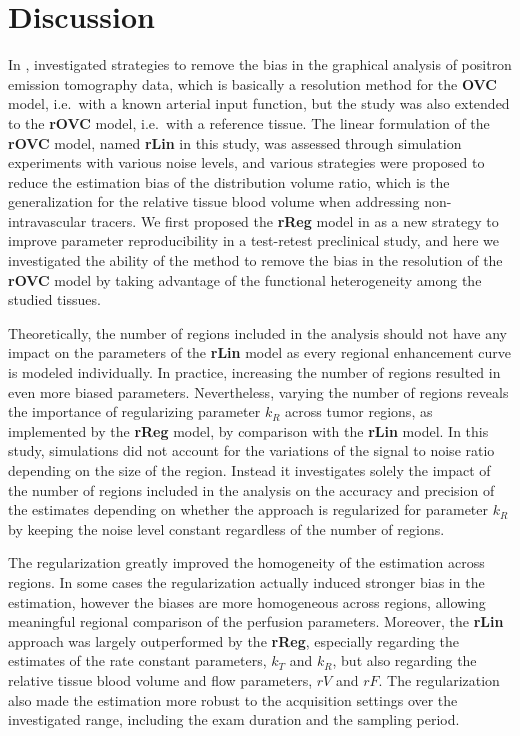 \section{Discussion}
In \citeyear{Logan:2001ip}, \citet{Logan:2001ip} investigated strategies to remove the bias in the graphical analysis of positron emission tomography data, which is basically a resolution method for the \textbf{OVC} model, i.e.~with a known arterial input function, but the study was also extended to the \textbf{rOVC} model, i.e.~with a reference tissue.
The linear formulation of the \textbf{rOVC} model, named \textbf{rLin} in this study, was assessed through simulation experiments with various noise levels, and various strategies were proposed to reduce the estimation bias of the distribution volume ratio, which is the generalization for the relative tissue blood volume when addressing non-intravascular tracers.
We first proposed the \textbf{rReg} model in \cite{Doury:2016fi} as a new strategy to improve parameter reproducibility in a test-retest preclinical study, and here we investigated the ability of the method to remove the bias in the resolution of the \textbf{rOVC} model by taking advantage of the functional heterogeneity among the studied tissues.

Theoretically, the number of regions included in the analysis should not have any impact on the parameters of the \textbf{rLin} model as every regional enhancement curve is modeled individually. 
In practice, increasing the number of regions resulted in even more biased parameters.
Nevertheless, varying the number of regions reveals the importance of regularizing parameter $k_R$ across tumor regions, as implemented by the \textbf{rReg} model, by comparison with the \textbf{rLin} model.
In this study, simulations did not account for the variations of the signal to noise ratio depending on the size of the region.
Instead it investigates solely the impact of the number of regions included in the analysis on the accuracy and precision of the estimates depending on whether the approach is regularized for parameter $k_R$ by keeping the noise level constant regardless of the number of regions.

The regularization greatly improved the homogeneity of the estimation across regions.
In some cases the regularization actually induced stronger bias in the estimation, however the biases are more homogeneous across regions, allowing meaningful regional comparison of the perfusion parameters.
Moreover, the \textbf{rLin} approach was largely outperformed by the \textbf{rReg}, especially regarding the estimates of the rate constant parameters, $k_T$ and $k_R$, but also regarding the relative tissue blood volume and flow parameters, $rV$ and $rF$.
The regularization also made the estimation more robust to the acquisition settings over the investigated range, including the exam duration and the sampling period.

